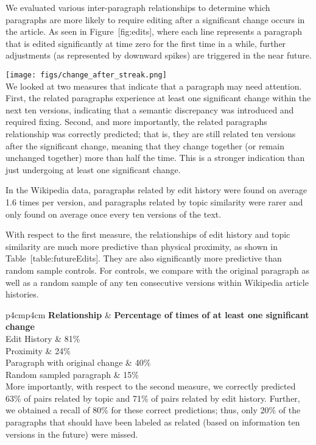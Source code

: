 We evaluated various inter-paragraph relationships to determine which
paragraphs are more likely to require editing after a significant change
occurs in the article. As seen in Figure~{[}fig:edits{]}, where each
line represents a paragraph that is edited significantly at time zero
for the first time in a while, further adjustments (as represented by
downward spikes) are triggered in the near future.

\texttt{[image: figs/change\_after\_streak.png]}\\

We looked at two measures that indicate that a paragraph may need
attention. First, the related paragraphs experience at least one
significant change within the next ten versions, indicating that a
semantic discrepancy was introduced and required fixing. Second, and
more importantly, the related paragraphs relationship was correctly
predicted; that is, they are still related ten versions after the
significant change, meaning that they change together (or remain
unchanged together) more than half the time. This is a stronger
indication than just undergoing at least one significant change.

In the Wikipedia data, paragraphs related by edit history were found on
average 1.6 times per version, and paragraphs related by topic
similarity were rarer and only found on average once every ten versions
of the text.

With respect to the first measure, the relationships of edit history and
topic similarity are much more predictive than physical proximity, as
shown in Table~{[}table:futureEdits{]}. They are also significantly more
predictive than random sample controls. For controls, we compare with
the original paragraph as well as a random sample of any ten consecutive
versions within Wikipedia article histories.

{\textbar{}p{4cm}\textbar{}p{4cm}\textbar{}} \textbf{Relationship} \&
\textbf{Percentage of times of at least one significant change}\\Edit
History \& 81\%\\

Proximity \& 24\%\\

Paragraph with original change \& 40\%\\

Random sampled paragraph \& 15\%\\

More importantly, with respect to the second measure, we correctly
predicted 63\% of pairs related by topic and 71\% of pairs related by
edit history. Further, we obtained a recall of 80\% for these correct
predictions; thus, only 20\% of the paragraphs that should have been
labeled as related (based on information ten versions in the future)
were missed.

